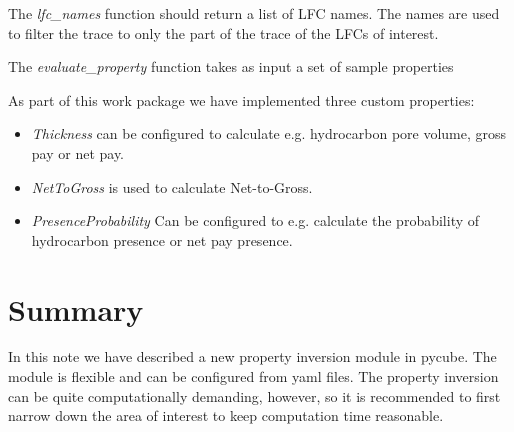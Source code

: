 \documentclass[note,screen,english,12pt,utf8]{nrdoc}
\begin{document}
The \emph{lfc\_names} function should return a list of LFC names. The
names are used to filter the trace to only the part of the
trace of the LFCs of interest.

The \emph{evaluate\_property} function takes as input a set of sample properties

As part of this work package we have implemented three custom properties:
\begin{itemize}
    \item \emph{Thickness} can be configured to calculate e.g. hydrocarbon pore volume, gross pay or net pay.
    \item \emph{NetToGross} is used to calculate Net-to-Gross.
    \item \emph{PresenceProbability} Can be configured to e.g. calculate the probability of hydrocarbon presence or net pay presence.
\end{itemize}


\section{Summary}
In this note we have described a new property inversion module in pycube.
The module is flexible and can be configured from yaml files. The property
inversion can be quite computationally demanding, however, so it is
recommended to first narrow down the area of interest to keep computation
time reasonable.


\end{document}

